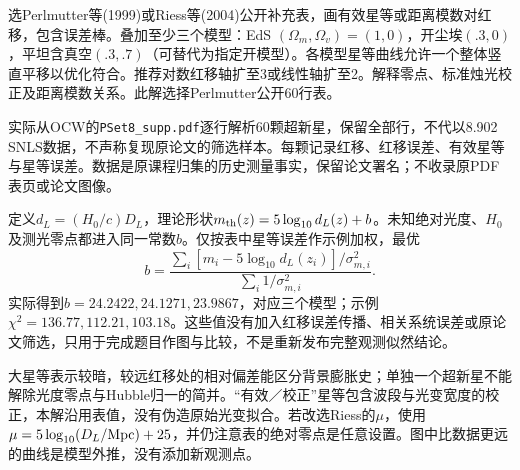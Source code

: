 \begin{exercise}
选Perlmutter等(1999)或Riess等(2004)公开补充表，画有效星等或距离模数对红移，包含误差棒。叠加至少三个模型：EdS $(\Omega_m,\Omega_v)=(1,0)$，开尘埃$(.3,0)$，平坦含真空$(.3,.7)$（可替代为指定开模型）。各模型星等曲线允许一个整体竖直平移以优化符合。推荐对数红移轴扩至3或线性轴扩至2。解释零点、标准烛光校正及距离模数关系。此解选择Perlmutter公开60行表。
\end{exercise}
\begin{solution}
实际从OCW的\texttt{PSet8\_supp.pdf}逐行解析60颗超新星，保留全部行，不代以8.902 SNLS数据，不声称复现原论文的筛选样本。每颗记录红移、红移误差、有效星等与星等误差。数据是原课程归集的历史测量事实，保留论文署名；不收录原PDF表页或论文图像。

定义$d_L=(H_0/c)D_L$，理论形状$m_{\rm th}(z)=5\log_{10}d_L(z)+b$。未知绝对光度、$H_0$及测光零点都进入同一常数$b$。仅按表中星等误差作示例加权，最优
\[
 b=\frac{\sum_i[m_i-5\log_{10}d_L(z_i)]/\sigma_{m,i}^2}
 {\sum_i1/\sigma_{m,i}^2}.
\]
实际得到$b=24.2422,24.1271,23.9867$，对应三个模型；示例$\chi^2=136.77,112.21,103.18$。这些值没有加入红移误差传播、相关系统误差或原论文筛选，只用于完成题目作图与比较，不是重新发布完整观测似然结论。
\begin{center}\end{center}
大星等表示较暗，较远红移处的相对偏差能区分背景膨胀史；单独一个超新星不能解除光度零点与Hubble归一的简并。“有效／校正”星等包含波段与光变宽度的校正，本解沿用表值，没有伪造原始光变拟合。若改选Riess的$\mu$，使用$\mu=5\log_{10}(D_L/{\rm Mpc})+25$，并仍注意表的绝对零点是任意设置。图中比数据更远的曲线是模型外推，没有添加新观测点。
\end{solution}
